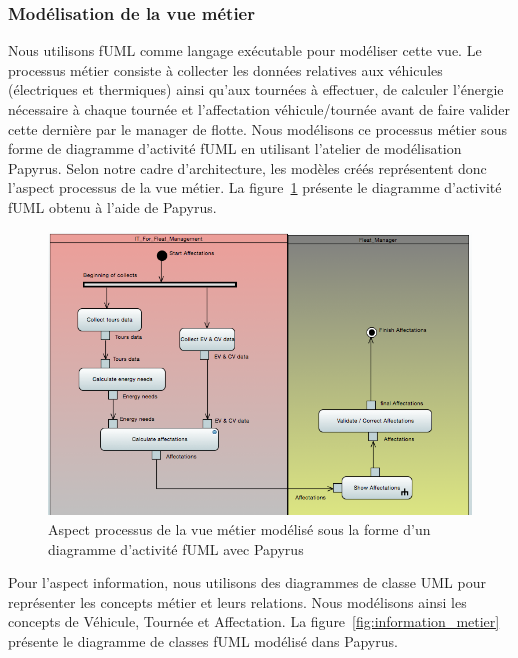 \subsubsection{Modélisation de la vue métier} 

Nous utilisons fUML comme langage
exécutable pour modéliser cette vue. Le processus métier consiste à collecter
les données relatives aux véhicules (électriques et thermiques) ainsi qu'aux
tournées à effectuer, de calculer l'énergie nécessaire à chaque tournée et
l'affectation véhicule/tournée avant de faire valider cette dernière par le
manager de flotte. Nous modélisons ce processus métier sous forme de diagramme
d'activité fUML en utilisant l'atelier de modélisation Papyrus. Selon notre cadre
d'architecture, les modèles créés représentent donc l'aspect processus de la vue
métier. La figure~\ref{fig:processus_fuml} présente le diagramme d'activité fUML obtenu à
l'aide de Papyrus.

\begin{figure}[!htbp]
 \begin{center}
  \includegraphics[width=1\textwidth]{figures/5_implementation/processus_fuml.png}
 \end{center}
 \caption{Aspect processus de la vue métier modélisé sous la forme d'un diagramme d'activité fUML avec Papyrus}
 \label{fig:processus_fuml}
\end{figure}


Pour l'aspect information, nous utilisons des diagrammes de classe UML pour
représenter les concepts métier et leurs relations. Nous modélisons ainsi les
concepts de Véhicule, Tournée et Affectation. La figure~\ref{fig:information_metier}
présente le diagramme de classes fUML modélisé dans Papyrus.

